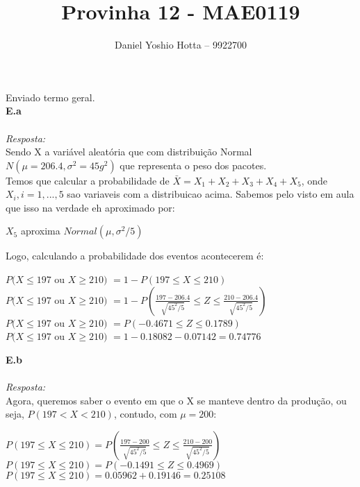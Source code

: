 \documentclass{article}
\begin{document}
	
	\title{Provinha 12 - MAE0119}
	\author{Daniel Yoshio Hotta – 9922700}
	
	\maketitle	
	
	Enviado termo geral.\\
	
	\textbf {E.a} 
	\\ \\
	\textit {Resposta:} \\
    
    Sendo X a variável aleatória que com distribuição Normal $N(\mu = 206.4, \sigma^2 = 45g^2)$ que representa o peso dos pacotes.\\
    
    Temos que calcular a probabilidade de $\bar {X} = X_1 + X_2 + X_3 + X_4 + X_5$, onde $X_i, i = {1, ..., 5}$ sao variaveis com a distribuicao acima. Sabemos pelo visto em aula que isso na verdade eh aproximado por:\\
    
    \begin{center}
    	$X_5$ aproxima $Normal (\mu, \sigma ^2 / 5) $
    \end{center}

    Logo, calculando a probabilidade dos eventos acontecerem é:
    
    \begin{center}
    	$P(X \leq 197$ ou $X \geq 210)$ $ = 1 - P(197 \leq X \leq 210)$\\
    	$P(X \leq 197$ ou $X \geq 210)$ $ = 1 - P (\frac {197 - 206.4}{\sqrt{45^2/5}} \leq Z \leq \frac {210 - 206.4}{\sqrt{45^2/5}})$\\    	
    	$P(X \leq 197$ ou $X \geq 210)$ $ = P (-0.4671 \leq Z \leq 0.1789)$\\
    	$P(X \leq 197$ ou $X \geq 210)$ $ = 1 - 0.18082 - 0.07142 = 0.74776$
    \end{center}
    
    \textbf {E.b} 
    \\ \\
    \textit {Resposta:} \\	
        
    Agora, queremos saber o evento em que o X se manteve dentro da produção, ou seja, $P (197 < X < 210)$, contudo, com $\mu = 200$:\\
    
    \begin{center}
    	$P(197 \leq X \leq 210) = P (\frac {197 - 200}{\sqrt{45^2/5}} \leq Z \leq \frac {210 - 200}{\sqrt{45^2/5}})$\\
    	$P(197 \leq X \leq 210) = P (-0.1491 \leq Z \leq 0.4969)$\\
    	$P(197 \leq X \leq 210) = 0.05962 + 0.19146 = 0.25108$
    \end{center}
\end{document}
